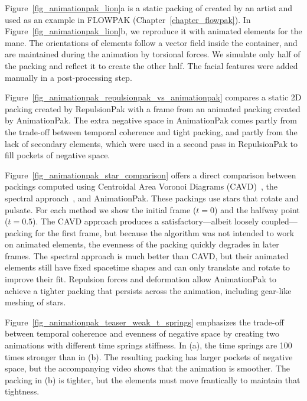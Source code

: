 Figure~\ref{fig_animationpak_lion}a is a static packing of  created by an artist and
used as an example in FLOWPAK (Chapter~\ref{chapter_flowpak}).  In Figure~\ref{fig_animationpak_lion}b,
we reproduce it with animated elements for the mane.
The orientations of elements follow a vector field inside
the container, and are maintained during the animation by 
torsional forces.
We simulate only half of the packing and reflect it to create the other half.
The facial features were added manually in a post-processing step.


Figure~\ref{fig_animationpak_repulsionpak_vs_animationpak} compares
a static 2D packing created by RepulsionPak with a frame
from an animated packing created by AnimationPak.
The extra negative space in AnimationPak comes partly from the trade-off
between temporal coherence and tight packing, and partly from the lack
of secondary elements, which were used in a second pass in RepulsionPak 
to fill pockets of negative space.


Figure~\ref{fig_animationpak_star_comparison} offers a direct comparison between
packings computed using Centroidal Area Voronoi Diagrams
(CAVD)~\cite{Smith2005}, the spectral approach~\cite{Dalal2006}, and AnimationPak.
These packings use stars that rotate and pulsate.
For each method we show the initial frame ($t=0$) and the halfway point
($t=0.5$).  The CAVD approach produces a satisfactory---albeit
loosely coupled---packing for the first frame, but because the 
algorithm was not intended to work on animated elements, 
the evenness of the packing quickly degrades in later frames.
The spectral approach is much better
than CAVD, but their animated elements still have fixed spacetime shapes
and can only translate and rotate to improve their fit. 
Repulsion forces and deformation allow AnimationPak to achieve a tighter packing
that persists across the animation, including gear-like meshing of
 stars.




Figure~\ref{fig_animationpak_teaser_weak_t_springs} emphasizes the trade-off between
temporal coherence and evenness of negative space by creating two animations
with different time springs stiffness.  In (a), the time springs
are 100 times stronger than in (b).  The resulting packing has larger
pockets of negative space, but the accompanying video shows that the
animation is smoother.  The packing in (b) is tighter, but the elements
must move frantically to maintain that tightness.


